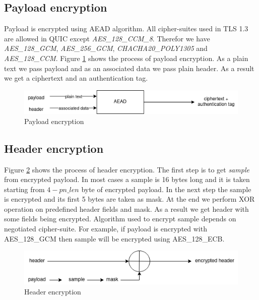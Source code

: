 \subsection{Payload encryption} 
Payload is encrypted using AEAD algorithm.
All cipher-suites used in TLS 1.3 are allowed in QUIC except \textit{AES\_128\_CCM\_8}. 
Therefor we have \textit{AES\_128\_GCM}, \textit{AES\_256\_GCM}, \textit{CHACHA20\_POLY1305} and \textit{AES\_128\_CCM}.
Figure \ref{fig:payload_enc} shows the process of payload encryption.
As a plain text we pass payload and as an associated data we pass plain header.
As a result we get a ciphertext and an authentication tag.

\begin{figure}[h]
    \centering
    \includegraphics[width=\textwidth]{img/packet_enc.png}
    \caption{Payload encryption}
    \label{fig:payload_enc}
\end{figure}

\subsection{Header encryption}
Figure \ref{fig:header_enc} shows the process of header encryption.
The first step is to get \textit{sample} from encrypted payload.
In most cases a sample is 16 bytes long and it is taken starting from $4 - pn\_len$ byte of encrypted payload.
In the next step the sample is encrypted and its first 5 bytes are taken as mask.
At the end we perform XOR operation on predefined header fields and mask.
As a result we get header with some fields being encrypted.
Algorithm used to encrypt sample depends on negotiated cipher-suite.
For example, if payload is encrypted with AES\_128\_GCM then sample will be encrypted using AES\_128\_ECB.

\begin{figure}[h]
    \centering
    \includegraphics[width=\textwidth]{img/header_enc.png}
    \caption{Header encryption}
    \label{fig:header_enc}
\end{figure}

